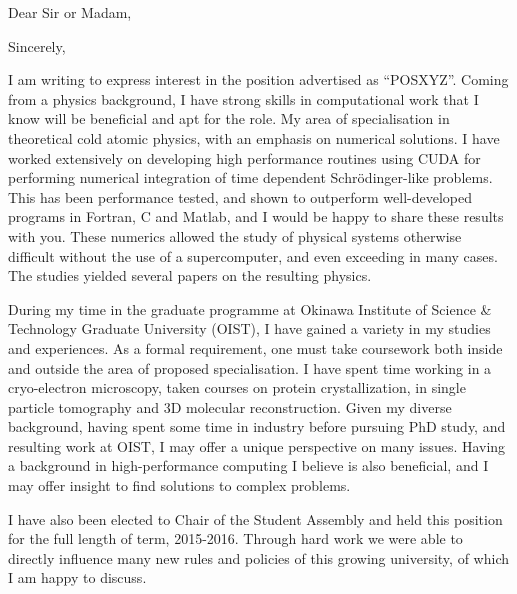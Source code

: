 \documentclass[12pt,a4paper,unicode]{moderncv}
\begin{document}
    \date{\today} %
    \opening{Dear Sir or Madam,}
    \closing{Sincerely,}
    \makelettertitle

{
    I am writing to express interest in the position advertised as ``POSXYZ''. Coming from a physics background, I have strong skills in computational work that I know will be beneficial and apt for the role. My area of specialisation in theoretical cold atomic physics, with an emphasis on numerical solutions. I have worked extensively on developing high performance routines using CUDA for performing numerical integration of time dependent Schr\"odinger-like problems. This has been performance tested, and shown to outperform well-developed programs in Fortran, C and Matlab, and I would be happy to share these results with you. These numerics allowed the study of physical systems otherwise difficult without the use of a supercomputer, and even exceeding in many cases. The studies yielded several papers on the resulting physics.

    During my time in the graduate programme at Okinawa Institute of Science \& Technology Graduate University (OIST), I have gained a variety in my studies and experiences. As a formal requirement, one must take coursework both inside and outside the area of proposed specialisation. I have spent time working in a cryo-electron microscopy, taken courses on protein crystallization, in single particle tomography and 3D molecular reconstruction. Given my diverse background, having spent some time in industry before pursuing PhD study, and resulting work at OIST, I may offer a unique perspective on many issues. Having a background in high-performance computing I believe is also beneficial, and I may offer insight to find solutions to complex problems.

    I have also been elected to Chair of the Student Assembly and held this position for the full length of term, 2015-2016. Through hard work we were able to directly influence many new rules and policies of this growing university, of which I am happy to discuss.

}
\makeletterclosing
\end{document}
